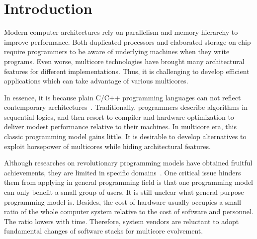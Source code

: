 \section{Introduction}\label{sec:Intro}
Modern computer architectures rely on parallelism and memory
hierarchy to improve performance. Both duplicated processors and
elaborated storage-on-chip require programmers to be aware of underlying
machines when they write programs. Even worse,
multicore technologies have brought many architectural features for
different implementations. Thus, it is challenging to develop
efficient applications which can take advantage of various multicores.

In essence, it is because plain C/C++ programming languages
can not reflect contemporary architectures~\cite{cml}. Traditionally, programmers
describe algorithms in sequential logics, and then resort to  compiler
and hardware optimization to deliver modest performance relative to
their machines. In multicore era, this classic programming model gains
little. It is desirable to develop alternatives to exploit horsepower
of multicores while hiding architectural features.

Although researches on revolutionary programming models have obtained
fruitful achievements, they are limited in specific
domains~\cite{gmapreduce, erlang, haskell}.
One critical issue hinders them from applying in general programming
field is that one programming model can only
benefit a small group of users. It is still unclear what
general purpose programming model is. Besides, the cost of hardware
usually occupies a small ratio of the whole computer system relative
to the cost of software and
personnel. The ratio lowers with time. Therefore, system vendors are
reluctant to adopt fundamental changes of software stacks for
multicore evolvement.



